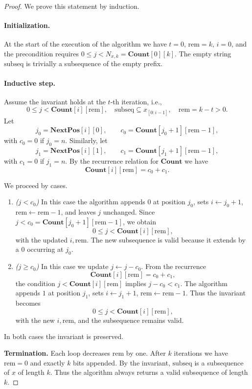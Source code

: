 \documentclass[10pt,a4paper]{amsart}
\newcommand{\Cnt}{\mathbf{Count}}
\newcommand{\NextPos}{\mathbf{NextPos}}
\newcommand{\rem}{\mathrm{rem}}
\newcommand{\subseq}{\mathrm{subseq}}
\begin{document}
\begin{proof}
We prove this statement by induction.

\paragraph{Initialization.} At the start of the execution of the algorithm we have $t=0$, $\rem=k$, $i=0$, and the precondition requires $0\leq j<N_{x,k}=\Cnt[0][k]$.  
The empty string $\subseq$ is trivially a subsequence of the empty prefix.


\paragraph{Inductive step.}  
Assume the invariant holds at the $t$-th iteration, i.e.,
\[
    0 \le j < \Cnt[i][\rem],
    \quad \subseq \subseteq x_{[0: i-1]},
    \quad \rem=k-t>0.
\]
Let
\[
j_0 = \NextPos[i][0], 
\qquad 
c_0 = \Cnt[j_0+1][\rem-1],
\]
with $c_0=0$ if $j_0=n$.  
Similarly, let
\[
j_1 = \NextPos[i][1], 
\qquad 
c_1 = \Cnt[j_1+1][\rem-1],
\]
with $c_1=0$ if $j_1=n$.  
By the recurrence relation for $\Cnt$ we have
\[
\Cnt[i][\rem] = c_0 + c_1.
\]

We proceed by cases.
\begin{enumerate}
    \item \emph{($j<c_0$)} In this case the algorithm appends $0$ at position $j_0$, sets $i\gets j_0+1$, $\rem\gets\rem-1$, and leaves $j$ unchanged.  
    Since $j<c_0=\Cnt[j_0+1][\rem-1]$, we obtain
    \[
    0 \le j < \Cnt[i][\rem],
    \]
    with the updated $i,\rem$. The new subsequence is valid because it extends by a $0$ occurring at $j_0$.

    \item \emph{($j\ge c_0$)}  
In this case we update $j\gets j-c_0$. From the recurrence
\[
\Cnt[i][\rem]=c_0+c_1,
\]
the condition $j<\Cnt[i][\rem]$ implies $j-c_0<c_1$.  
The algorithm appends $1$ at position $j_1$, sets $i\gets j_1+1$, $\rem\gets\rem-1$.  
Thus the invariant becomes
\[
0 \le j < \Cnt[i][\rem],
\]
with the new $i,\rem$, and the subsequence remains valid.
\end{enumerate}  


In both cases the invariant is preserved.

\medskip\noindent
\textbf{Termination.}  
Each loop decreases $\rem$ by one. After $k$ iterations we have $\rem=0$ and exactly $k$ bits appended. By the invariant, $\subseq$ is a subsequence of $x$ of length $k$. Thus the algorithm always returns a valid subsequence of length $k$.
\end{proof}
\end{document}
